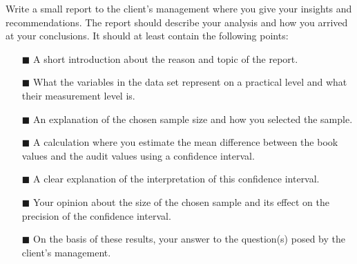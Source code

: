 Write a small report to the client's management where you give your insights and recommendations. The report should describe your analysis and how you arrived at your conclusions. It should at least contain the following points: \\

\begin{itemize}
    \item[$\blacksquare$] A short introduction about the reason and topic of the report.
    \item[$\blacksquare$] What the variables in the data set represent on a practical level and what their measurement level is. 
    \item[$\blacksquare$] An explanation of the chosen sample size and how you selected the sample.
    \item[$\blacksquare$] A calculation where you estimate the mean difference between the book values and the audit values using a confidence interval.
    \item[$\blacksquare$] A clear explanation of the interpretation of this confidence interval.
    \item[$\blacksquare$] Your opinion about the size of the chosen sample and its effect on the precision of the confidence interval. 
    \item[$\blacksquare$] On the basis of these results, your answer to the question(s) posed by the client's management.
\end{itemize}

\clearpage %